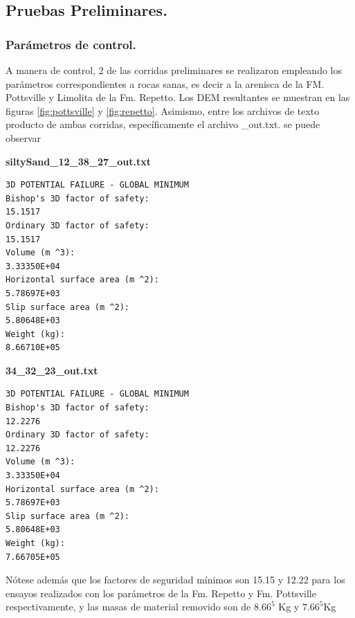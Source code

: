 \subsection{Pruebas Preliminares.}
\label{chap:pruebas preliminares}
\subsubsection{Par\'ametros de control.}

A manera de control, 2 de las corridas preliminares se realizaron empleando los par\'ametros correspondientes a rocas sanas, es decir a la arenisca de la FM. Pottsville y Limolita de la Fm. Repetto. Los DEM resultantes se muestran en las figuras \ref{fig:pottsville} y \ref{fig:repetto}.
Asimismo, entre los archivos de texto producto de ambas corridas, espec\'ificamente el archivo \_out.txt. se puede observar\linebreak


\pagebreak
\begin{center}
\textbf{siltySand\_12\_38\_27\_out.txt}

\begin{verbatim}
3D POTENTIAL FAILURE - GLOBAL MINIMUM
Bishop's 3D factor of safety:                                          15.1517
Ordinary 3D factor of safety:                                          15.1517
Volume (m ^3):                                                     3.33350E+04
Horizontal surface area (m ^2):                                    5.78697E+03
Slip surface area (m ^2):                                          5.80648E+03
Weight (kg):                                                       8.66710E+05
\end{verbatim}
\end{center}

\begin{center}

\textbf{34\_32\_23\_out.txt}
\begin{verbatim}
3D POTENTIAL FAILURE - GLOBAL MINIMUM
Bishop's 3D factor of safety:                                          12.2276
Ordinary 3D factor of safety:                                          12.2276
Volume (m ^3):                                                     3.33350E+04
Horizontal surface area (m ^2):                                    5.78697E+03
Slip surface area (m ^2):                                          5.80648E+03
Weight (kg):                                                       7.66705E+05
\end{verbatim}

\end{center}
N\'otese adem\'as que los factores de seguridad m\'inimos son 15.15 y 12.22 para los ensayos realizados con los par\'ametros de la Fm. Repetto y Fm. Pottsville respectivamente, y las masas de material removido son de $8.66^{5}$ Kg y $7.66^{5}$Kg

